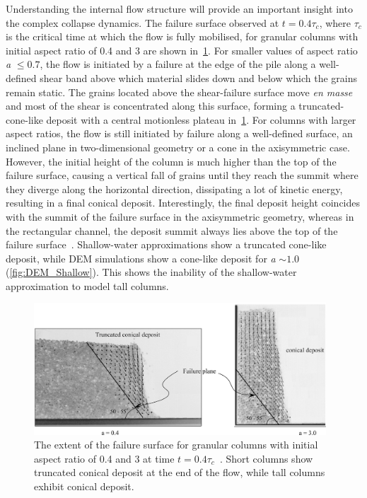 Understanding the internal flow structure will provide an important insight 
into the complex collapse dynamics. The failure surface observed at $t 
= 0.4 \tau_c$, where $\tau_c$ is the critical time at which the flow is fully 
mobilised, for granular columns with initial aspect ratio of 0.4 and 3 are 
shown in~\cref{fig:Deposit}.  For smaller values of aspect ratio \textit{a} 
$\le 0.7$, the flow is initiated by a failure at the edge of the pile along a 
well-defined shear band above which material slides down and below 
which the grains remain static. The grains located above the shear-failure 
surface move \textit{en masse} and most of the shear is concentrated along 
this surface, forming a truncated-cone-like deposit with a central 
motionless plateau in~\cref{fig:Deposit}. For columns with larger aspect 
ratios, the flow is still initiated by failure along a well-defined surface, an 
inclined plane in two-dimensional geometry or a cone in the axisymmetric case. 
However, the initial height of the column is much higher than the top of the 
failure surface, causing a vertical fall of grains until they reach the summit 
where they diverge along the horizontal direction, dissipating a lot of kinetic 
energy, resulting in a final conical deposit. Interestingly, the final deposit 
height coincides with the summit of the failure surface in the axisymmetric 
geometry, whereas in the rectangular channel, the deposit summit always lies 
above the top of the failure surface~\citep{Lajeunesse2005}. Shallow-water 
approximations show a truncated cone-like deposit, while DEM simulations show 
a cone-like deposit for \textit{a} $\sim 1.0$ (\cref{fig:DEM_Shallow}). This 
shows the inability of the shallow-water approximation to model tall 
columns.

\begin{figure}[tbhp]
\centering
\includegraphics[width=0.975\textwidth]{Deposit}
\caption{The extent of the failure surface for granular columns with initial 
aspect ratio of 0.4 and 3 at time $t= 0.4\tau_c$~\citep{Lajeunesse2004}. Short 
columns show truncated conical deposit at the end of the flow, while tall 
columns exhibit conical deposit.}
\label{fig:Deposit}
\end{figure}


